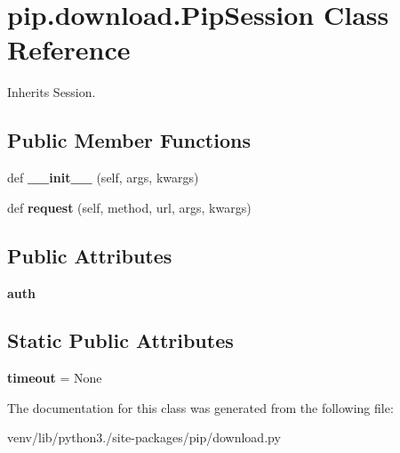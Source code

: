 \hypertarget{classpip_1_1download_1_1_pip_session}{}\section{pip.\+download.\+Pip\+Session Class Reference}
\label{classpip_1_1download_1_1_pip_session}


Inherits Session.

\subsection*{Public Member Functions}
\begin{DoxyCompactItemize}
\item 
\mbox{\label{classpip_1_1download_1_1_pip_session_a27f72d7c4705f26728cbf59b622dfa73}} 
def {\bfseries \+\_\+\+\_\+init\+\_\+\+\_\+} (self, args, kwargs)
\item 
\mbox{\label{classpip_1_1download_1_1_pip_session_a8b187ec4c644a33771ad80bd2f10ecbd}} 
def {\bfseries request} (self, method, url, args, kwargs)
\end{DoxyCompactItemize}
\subsection*{Public Attributes}
\begin{DoxyCompactItemize}
\item 
\mbox{\label{classpip_1_1download_1_1_pip_session_a9d7fd20c523759b93b7611f027d6f6bd}} 
{\bfseries auth}
\end{DoxyCompactItemize}
\subsection*{Static Public Attributes}
\begin{DoxyCompactItemize}
\item 
\mbox{\label{classpip_1_1download_1_1_pip_session_a5bbddae62841c05db10e1314b320d368}} 
{\bfseries timeout} = None
\end{DoxyCompactItemize}


The documentation for this class was generated from the following file\+:\begin{DoxyCompactItemize}
\item 
venv/lib/python3./site-\/packages/pip/download.\+py\end{DoxyCompactItemize}
